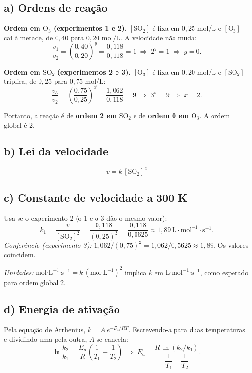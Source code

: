 \documentclass{article}%
\begin{document}
\subsection*{a) Ordens de reação}

\textbf{Ordem em $\mathrm{O_3}$ (experimentos 1 e 2).} $[\mathrm{SO_2}]$ é fixa em $0{,}25$ mol/L e $[\mathrm{O_3}]$ cai à metade, de $0{,}40$ para $0{,}20$ mol/L. A velocidade não muda:
\[
\frac{v_1}{v_2}=\left(\frac{0{,}40}{0{,}20}\right)^{y}=\frac{0{,}118}{0{,}118}=1
\;\Rightarrow\; 2^{y}=1 \;\Rightarrow\; y=0 .
\]

\textbf{Ordem em $\mathrm{SO_2}$ (experimentos 2 e 3).} $[\mathrm{O_3}]$ é fixa em $0{,}20$ mol/L e $[\mathrm{SO_2}]$ triplica, de $0{,}25$ para $0{,}75$ mol/L:
\[
\frac{v_3}{v_2}=\left(\frac{0{,}75}{0{,}25}\right)^{x}=\frac{1{,}062}{0{,}118}=9
\;\Rightarrow\; 3^{x}=9 \;\Rightarrow\; x=2 .
\]

Portanto, a reação é de \textbf{ordem 2 em $\mathrm{SO_2}$} e de \textbf{ordem 0 em $\mathrm{O_3}$}. A ordem global é 2.

\subsection*{b) Lei da velocidade}

\[
\boxed{v = k\,[\mathrm{SO_2}]^{2}}
\]

\subsection*{c) Constante de velocidade a 300 K}

Usa-se o experimento 2 (o 1 e o 3 dão o mesmo valor):
\[
k_1=\frac{v}{[\mathrm{SO_2}]^2}=\frac{0{,}118}{(0{,}25)^2}=\frac{0{,}118}{0{,}0625}\approx 1{,}89\ \text{L}\cdot\text{mol}^{-1}\cdot\text{s}^{-1}.
\]
\emph{Conferência (experimento 3):} $1{,}062/(0{,}75)^2 = 1{,}062/0{,}5625 \approx 1{,}89$. Os valores coincidem.

\emph{Unidades:} $\text{mol·L}^{-1}\text{·s}^{-1} = k\,(\text{mol·L}^{-1})^{2}$ implica $k$ em $\text{L·mol}^{-1}\text{·s}^{-1}$, como esperado para ordem global 2.

\subsection*{d) Energia de ativação}

Pela equação de Arrhenius, $k = A\,e^{-E_a/RT}$. Escrevendo-a para duas temperaturas e dividindo uma pela outra, $A$ se cancela:
\[
\ln\frac{k_2}{k_1}=\frac{E_a}{R}\left(\frac{1}{T_1}-\frac{1}{T_2}\right)
\;\Rightarrow\;
E_a=\frac{R\,\ln(k_2/k_1)}{\dfrac{1}{T_1}-\dfrac{1}{T_2}} .
\]
\end{document}
